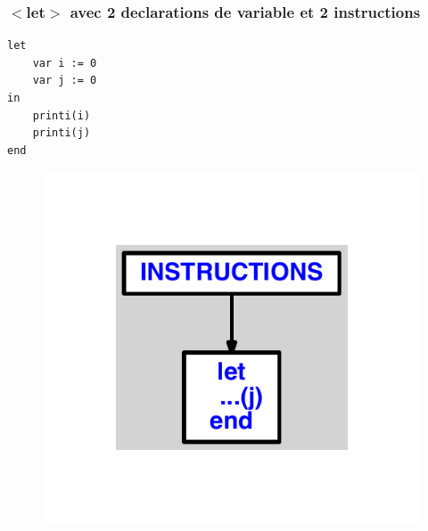 \documentclass{article}
\begin{document}
\subsubsection{$ < $let$ > $ avec 2 declarations de variable et 2 instructions}
\begin{lstlisting}
let
	var i := 0
	var j := 0
in
	printi(i)
	printi(j)
end
\end{lstlisting}
\newpage
\begin{figure}[H]
\centering
\includegraphics[max width=\textwidth]{ast/ast_276.pdf}
\end{figure}
\newpage
\end{document}
